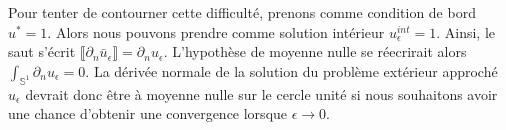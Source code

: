 Pour tenter de contourner cette difficulté, prenons comme condition de bord $u^* = 1$. Alors nous pouvons prendre comme solution intérieur $u^{int}_{\epsilon} = 1 $. Ainsi, le saut s'écrit $\llbracket \partial_n \bar{u}_{\epsilon} \rrbracket = \partial_n u_{\epsilon}$. L'hypothèse de moyenne nulle se réecrirait alors $\displaystyle \int_{\mathbb{S}^1} \partial_n u_{\epsilon} = 0 $. La dérivée normale de la solution du problème extérieur approché $u_{\epsilon}$ devrait donc être à moyenne nulle sur le cercle unité si nous souhaitons avoir une chance
d'obtenir une convergence lorsque $\epsilon \to 0$.


















